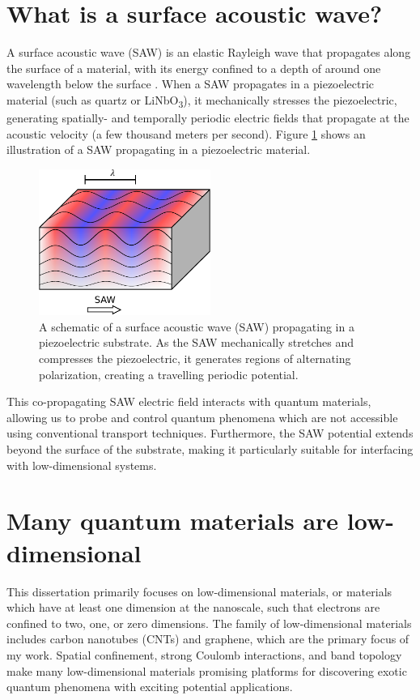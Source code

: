 \documentclass[double,12pt,1in,seploa]{beavtex}
\let\Oldsection\section
\renewcommand{\section}{\FloatBarrier\Oldsection}
\begin{document}
\section{What is a surface acoustic wave?}

A surface acoustic wave (SAW) is an elastic Rayleigh wave that propagates along the surface of a material, with its energy confined to a depth of around one wavelength below the surface \cite{rayleigh_waves_1885}. When a SAW propagates in a piezoelectric material (such as quartz or LiNbO\textsubscript{3}), it mechanically stresses the piezoelectric, generating spatially- and temporally periodic electric fields that propagate at the acoustic velocity (a few thousand meters per second). Figure \ref{SAW intro fig} shows an illustration of a SAW propagating in a piezoelectric material. 

\begin{figure}
    \includegraphics[width = 0.5\textwidth]{SAW intro fig.pdf}
    \caption{A schematic of a surface acoustic wave (SAW) propagating in a piezoelectric substrate. As the SAW mechanically stretches and compresses the piezoelectric, it generates regions of alternating polarization, creating a travelling periodic potential.}
    \label{SAW intro fig}
\end{figure}

This co-propagating SAW electric field interacts with quantum materials, allowing us to probe and control quantum phenomena which are not accessible using conventional transport techniques. Furthermore, the SAW potential extends beyond the surface of the substrate, making it particularly suitable for interfacing with low-dimensional systems.


\section{Many quantum materials are low-dimensional}

This dissertation primarily focuses on low-dimensional materials, or materials which have at least one dimension at the nanoscale, such that electrons are confined to two, one, or zero dimensions. The family of low-dimensional materials includes carbon nanotubes (CNTs) and graphene, which are the primary focus of my work. Spatial confinement, strong Coulomb interactions, and band topology make many low-dimensional materials promising platforms for discovering exotic quantum phenomena with exciting potential applications.
\end{document}
